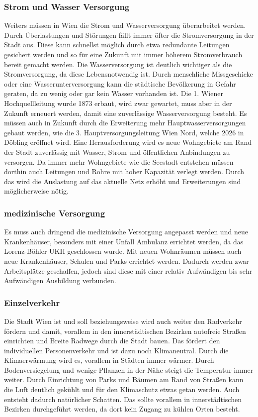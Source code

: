 \subsubsection{Strom und Wasser Versorgung}

Weiters müssen in Wien die Strom und Wasserversorgung überarbeitet werden. Durch Überlastungen und Störungen fällt immer öfter die Stromversorgung in der Stadt aus. Diese kann schnellst möglich durch etwa redundante Leitungen gesichert werden und so für eine Zukunft mit immer höherem Stromverbrauch bereit gemacht werden. Die Wasserversorgung ist deutlich wichtiger als die Stromversorgung, da diese Lebensnotwendig ist. Durch menschliche Missgeschicke oder eine Wasserunterversorgung kann die städtische Bevölkerung in Gefahr geraten, da zu wenig oder gar kein Wasser vorhanden ist. Die 1. Wiener Hochquellleitung wurde 1873 erbaut, wird zwar gewartet, muss aber in der Zukunft erneuert werden, damit eine zuverlässige Wasserversorgung besteht. Es müssen auch in Zukunft durch die Erweiterung mehr Hauptwasserversorgungen gebaut werden, wie die 3. Hauptversorgungsleitung Wien Nord, welche 2026 in Döbling eröffnet wird.
Eine Herausforderung wird es neue Wohngebiete am Rand der Stadt zuverlässig mit Wasser, Strom und öffentlichen Anbindungen zu versorgen. Da immer mehr Wohngebiete wie die Seestadt entstehen müssen dorthin auch Leitungen und Rohre mit hoher Kapazität verlegt werden. Durch das wird die Auslastung auf das aktuelle Netz erhöht und Erweiterungen sind möglicherweise nötig.

\subsubsection{medizinische Versorgung}

Es muss auch dringend die medizinische Versorgung angepasst werden und neue Krankenhäuser, besonders mit einer Unfall Ambulanz errichtet werden, da das Lorenz-Böhler UKH geschlossen wurde. Mit neuen Wohnräumen müssen auch neue Krankenhäuser, Schulen und Parks errichtet werden. Dadurch werden zwar Arbeitsplätze geschaffen, jedoch sind diese mit einer relativ Aufwändigen bis sehr Aufwändigen Ausbildung verbunden.

\subsubsection{Einzelverkehr}

Die Stadt Wien ist und soll beziehungsweise wird auch weiter den Radverkehr fördern und damit, vorallem in den innerstädtischen Bezirken autofreie Straßen einrichten und Breite Radwege durch die Stadt bauen. Das fördert den individuellen Personenverkehr und ist dazu noch Klimaneutral.
Durch die Klimaerwärmung wird es, vorallem in Städten immer wärmer. Durch Bodenversiegelung und wenige Pflanzen in der Nähe steigt die Temperatur immer weiter. Durch Einrichtung von Parks und Bäumen am Rand von Straßen kann die Luft deutlich gekühlt und für den Klimaschutz etwas getan werden. Auch entsteht dadurch natürlicher Schatten. Das sollte vorallem in innerstädtischen Bezirken durchgeführt werden, da dort kein Zugang zu kühlen Orten besteht.


